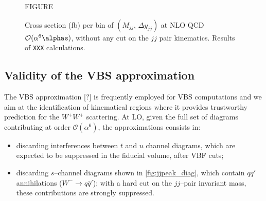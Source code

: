 \begin{figure}[hbt]
\centering
FIGURE
\caption{Cross section (fb) per bin of $(M_{jj},\,\Delta y_{jj})$ at NLO QCD $\mathcal{O}(\alpha^6\alphas)$, without any cut on the $jj$ pair kinematics. Results of \texttt{XXX} calculations.}\label{fig:mjjdyjj_2d_NLO}
\end{figure}
\newpage

\subsection{Validity of the VBS approximation}\label{subsec:VBSapprox}

The VBS approximation [?] is frequently employed for VBS computations and we aim at the identification of kinematical regions where it provides trustworthy prediction for the $W^+W^+$ scattering.
At LO, given the full set of diagrams contributing at order $\mathcal{O}(\alpha^6)$, the approximations consists in:
\begin{itemize}
\item discarding interferences between $t$ and $u$ channel diagrams, which are expected to be suppressed in the fiducial volume, after VBF cuts;
\item discarding $s$--channel diagrams shown in \autoref{fig:jjpeak_diag}, which contain $q\bar{q}'$ annihilations ($W^-\rightarrow q \bar{q}'$); with a hard cut on the $jj$--pair invariant mass, these contributions are strongly suppressed.
\end{itemize}

